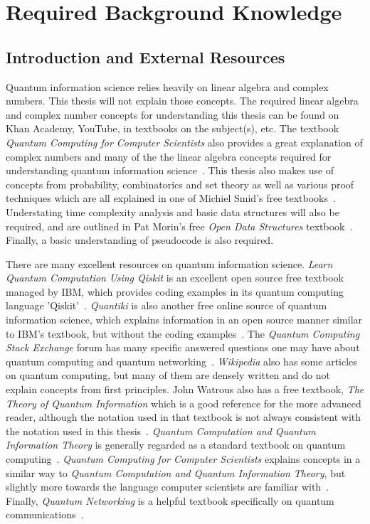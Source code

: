 \chapter{Required Background Knowledge}
\label{sec:RequiredBackgroundKnowledge}
\section{Introduction and External Resources}
Quantum information science relies heavily on linear algebra and complex numbers. This thesis will not explain those concepts. The required linear algebra and complex number concepts for understanding this thesis can be found on Khan Academy, YouTube, in textbooks on the subject(s), etc. The textbook \emph{Quantum Computing for Computer Scientists} also provides a great explanation of complex numbers and many of the the linear algebra concepts required for understanding quantum information science~\cite{yanofsky2008quantum}. This thesis also makes use of concepts from probability, combinatorics and set theory as well as various proof techniques which are all explained in one of Michiel Smid's free textbooks~\cite{michielSmidTextbook}. Understating time complexity analysis and basic data structures will also be required, and are outlined in Pat Morin's free \emph{Open Data Structures} textbook~\cite{morin2013open}. Finally, a basic understanding of pseudocode is also required.

There are many excellent resources on quantum information science. \emph{Learn Quantum Computation Using Qiskit} is an excellent open source free textbook managed by IBM, which provides coding examples in its quantum computing language 'Qiskit'~\cite{Qiskit-Textbook}. \emph{Quantiki} is also another free online source of quantum information science, which explains information in an open source manner similar to IBM's textbook, but without the coding examples~\cite{QuantikiRef}. The \emph{Quantum Computing Stack Exchange} forum has many specific answered questions one may have about quantum computing and quantum networking~\cite{QuantumComputingStackExchange}. \emph{Wikipedia} also has some articles on quantum computing, but many of them are densely written and do not explain concepts from first principles. John Watrous also has a free textbook, \emph{The Theory of Quantum Information} which is a good reference for the more advanced reader, although the notation used in that textbook is not always consistent with the notation used in this thesis~\cite{watrous2018theory}. \emph{Quantum Computation and Quantum Information Theory} is generally regarded as a standard textbook on quantum computing~\cite{nielsen2002quantum}. \emph{Quantum Computing for Computer Scientists} explains concepts in a similar way to \emph{Quantum Computation and Quantum Information Theory}, but slightly more towards the language computer scientists are familiar with~\cite{yanofsky2008quantum}. Finally, \emph{Quantum Networking} is a helpful textbook specifically on quantum communications~\cite{van2014quantum}.

